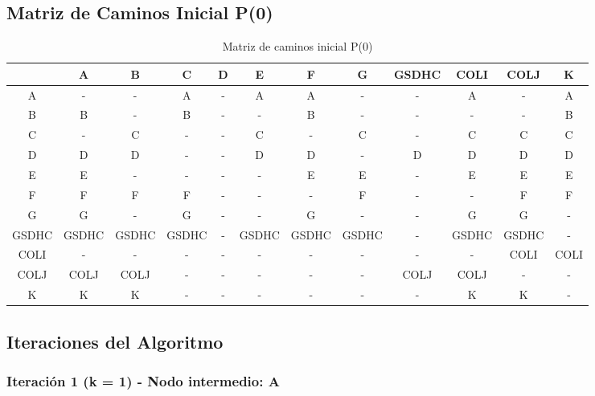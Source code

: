 \documentclass[12pt]{article}
\begin{document}
\subsection{Matriz de Caminos Inicial P(0)}
\begin{table}[h!]
\centering
\begin{tabular}{|c|c|c|c|c|c|c|c|c|c|c|c|}
\hline
 & A & B & C & D & E & F & G & GSDHC & COLI & COLJ & K \\\hline
A & - & - & A & - & A & A & - & - & A & - & A \\\hline
B & B & - & B & - & - & B & - & - & - & - & B \\\hline
C & - & C & - & - & C & - & C & - & C & C & C \\\hline
D & D & D & - & - & D & D & - & D & D & D & D \\\hline
E & E & - & - & - & - & E & E & - & E & E & E \\\hline
F & F & F & F & - & - & - & F & - & - & F & F \\\hline
G & G & - & G & - & - & G & - & - & G & G & - \\\hline
GSDHC & GSDHC & GSDHC & GSDHC & - & GSDHC & GSDHC & GSDHC & - & GSDHC & GSDHC & - \\\hline
COLI & - & - & - & - & - & - & - & - & - & COLI & COLI \\\hline
COLJ & COLJ & COLJ & - & - & - & - & - & COLJ & COLJ & - & - \\\hline
K & K & K & - & - & - & - & - & - & K & K & - \\\hline
\end{tabular}
\caption{Matriz de caminos inicial P(0)}
\end{table}

\clearpage
\subsection{Iteraciones del Algoritmo}
\subsubsection{Iteración 1 (k = 1) - Nodo intermedio: A}
\end{document}
